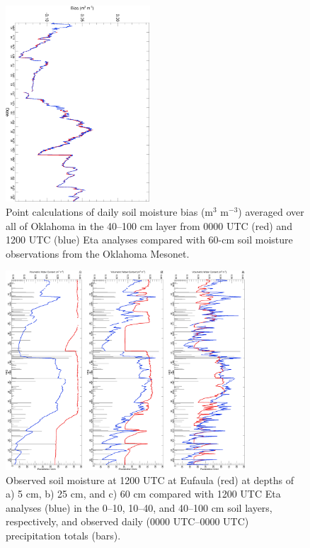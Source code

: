 \documentclass[twocolumn]{article}
\begin{document}
\begin{figure}[!t] %
\begin{center}
\includegraphics[angle=90, width=0.48\textwidth]{etacompfig7col}
\end{center}
\caption{
Point calculations of daily soil moisture bias (m$^3$ m$^{-3}$) averaged over all of Oklahoma in the 40--100 cm layer
from 0000 UTC (red) and 1200 UTC (blue) Eta analyses compared with 60-cm
soil moisture observations from the Oklahoma Mesonet.
\label{etacompfig7}
}
\end{figure}
\begin{figure}[!t] %
\begin{center}
\includegraphics[angle=90, width=0.80\textwidth]{etacompfig8col}
\end{center}
\caption{
Observed soil moisture at 1200 UTC at Eufaula (red) at depths
of a) 5 cm, b) 25 cm, and c) 60 cm compared
with 1200 UTC Eta analyses (blue) in the 0--10, 10--40, and 40--100 cm
soil layers, respectively, and observed daily (0000 UTC--0000 UTC)
precipitation totals (bars).
\label{etacompfig8}
}
\end{figure}
\end{document}
